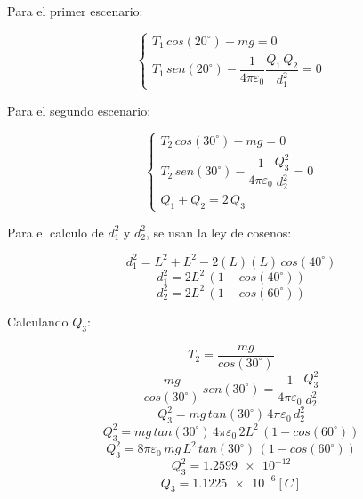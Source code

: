 \documentclass[letter,11pt]{article}
\begin{document}
\begin{enumerate}
Para el primer escenario:

\begin{equation*}
    \begin{cases}
        T_1\,cos(20^\circ)-mg = 0 \\
        T_1\,sen(20^\circ)-\dfrac{1}{4\pi\varepsilon_0}\dfrac{Q_1\,Q_2}{d^2_1} = 0
    \end{cases}
\end{equation*}

Para el segundo escenario:

\begin{equation*}
    \begin{cases}
        T_2\,cos(30^\circ)-mg = 0 \\
        T_2\,sen(30^\circ)-\dfrac{1}{4\pi\varepsilon_0}\dfrac{Q^2_3}{d^2_2} = 0 \\
        Q_1+Q_2 = 2\,Q_3
    \end{cases}
\end{equation*}

Para el calculo de $d^2_1$ y $d^2_2$, se usan la ley de cosenos:

\begin{equation*}
    d^2_1 = L^2+L^2-2(L)(L)\,cos(40^\circ)
\end{equation*}
\begin{equation*}
    d^2_1 = 2L^2\,(1-cos(40^\circ))
\end{equation*}
\begin{equation*}
    d^2_2 = 2L^2\,(1-cos(60^\circ))
\end{equation*}

Calculando $Q_3$:

\begin{equation*}
    T_2 = \frac{mg}{cos(30^\circ)}
\end{equation*}
\begin{equation*}
    \frac{mg}{cos(30^\circ)}\,sen(30^\circ) = \frac{1}{4\pi\varepsilon_0}\frac{Q^2_3}{d^2_2}
\end{equation*}
\begin{equation*}
    Q^2_3 = mg\,tan(30^\circ)\,4\pi\varepsilon_0\,d^2_2
\end{equation*}
\begin{equation*}
    Q^2_3 = mg\,tan(30^\circ)\,4\pi\varepsilon_0\,2L^2\,(1-cos(60^\circ))
\end{equation*}
\begin{equation*}
    Q^2_3 = 8\pi\varepsilon_0\,mg\,L^2\,tan(30^\circ)\,(1-cos(60^\circ))
\end{equation*}
\begin{equation*}
    Q^2_3 = \num{1.2599e-12}
\end{equation*}
\begin{equation*}
    Q_3 = \num{1.1225e-6} [C]
\end{equation*}


\end{enumerate}
\end{document}

